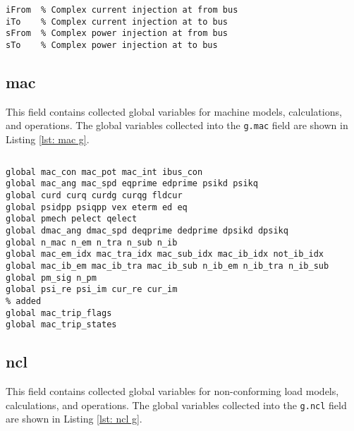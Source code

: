 \begin{lstlisting}[caption={Line Monitoring Global Field Variables},label={lst: lmon g}]
\end{lstlisting}\vspace{-2 em}
\begin{verbatim}
iFrom  % Complex current injection at from bus
iTo    % Complex current injection at to bus
sFrom  % Complex power injection at from bus
sTo    % Complex power injection at to bus
\end{verbatim}

\subsection{mac}
This field contains collected global variables for machine models, calculations, and operations.
The global variables collected into the \verb|g.mac| field are shown in Listing \ref{lst: mac g}.

\begin{lstlisting}[caption={Machine Global Field Variables},label={lst: mac g}]
\end{lstlisting}\vspace{-2 em}
\begin{verbatim}
global mac_con mac_pot mac_int ibus_con
global mac_ang mac_spd eqprime edprime psikd psikq
global curd curq curdg curqg fldcur
global psidpp psiqpp vex eterm ed eq
global pmech pelect qelect
global dmac_ang dmac_spd deqprime dedprime dpsikd dpsikq
global n_mac n_em n_tra n_sub n_ib
global mac_em_idx mac_tra_idx mac_sub_idx mac_ib_idx not_ib_idx
global mac_ib_em mac_ib_tra mac_ib_sub n_ib_em n_ib_tra n_ib_sub
global pm_sig n_pm 
global psi_re psi_im cur_re cur_im
% added
global mac_trip_flags
global mac_trip_states
\end{verbatim}

\subsection{ncl}
This field contains collected global variables for non-conforming load models, calculations, and operations.
The global variables collected into the \verb|g.ncl| field are shown in Listing \ref{lst: ncl g}.

